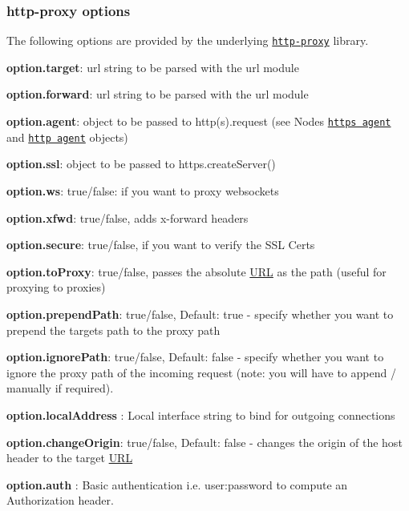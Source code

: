 \subsubsection*{http-\/proxy options}

The following options are provided by the underlying \href{https://github.com/nodejitsu/node-http-proxy#options}{\tt http-\/proxy} library.


\begin{DoxyItemize}
\item {\bfseries option.\+target}\+: url string to be parsed with the url module
\item {\bfseries option.\+forward}\+: url string to be parsed with the url module
\item {\bfseries option.\+agent}\+: object to be passed to http(s).request (see Node\textquotesingle{}s \href{http://nodejs.org/api/https.html#https_class_https_agent}{\tt https agent} and \href{http://nodejs.org/api/http.html#http_class_http_agent}{\tt http agent} objects)
\item {\bfseries option.\+ssl}\+: object to be passed to https.\+create\+Server()
\item {\bfseries option.\+ws}\+: true/false\+: if you want to proxy websockets
\item {\bfseries option.\+xfwd}\+: true/false, adds x-\/forward headers
\item {\bfseries option.\+secure}\+: true/false, if you want to verify the S\+SL Certs
\item {\bfseries option.\+to\+Proxy}\+: true/false, passes the absolute \mbox{\hyperlink{namespace_u_r_l}{U\+RL}} as the {\ttfamily path} (useful for proxying to proxies)
\item {\bfseries option.\+prepend\+Path}\+: true/false, Default\+: true -\/ specify whether you want to prepend the target\textquotesingle{}s path to the proxy path
\item {\bfseries option.\+ignore\+Path}\+: true/false, Default\+: false -\/ specify whether you want to ignore the proxy path of the incoming request (note\+: you will have to append / manually if required).
\item {\bfseries option.\+local\+Address} \+: Local interface string to bind for outgoing connections
\item {\bfseries option.\+change\+Origin}\+: true/false, Default\+: false -\/ changes the origin of the host header to the target \mbox{\hyperlink{namespace_u_r_l}{U\+RL}}
\item {\bfseries option.\+auth} \+: Basic authentication i.\+e. \textquotesingle{}user\+:password\textquotesingle{} to compute an Authorization header.

\end{DoxyItemize}
